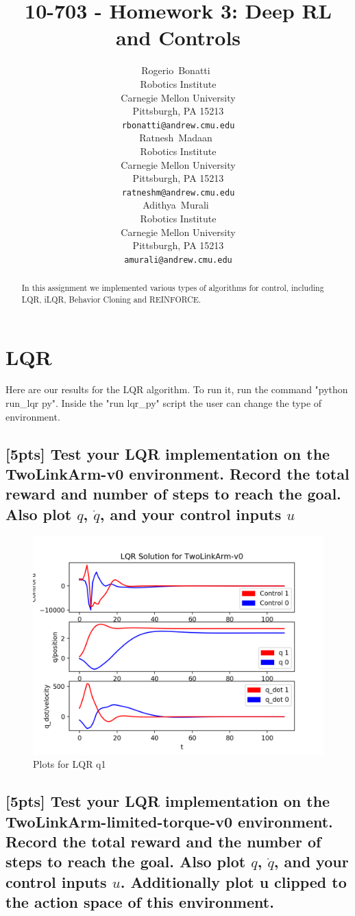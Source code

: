 \documentclass{article}
\title{10-703 - Homework 3: Deep RL and Controls}
\author{
  Rogerio~Bonatti\ \\
  Robotics Institute\\
  Carnegie Mellon University\\
  Pittsburgh, PA 15213 \\
  \texttt{rbonatti@andrew.cmu.edu} \\
  \And
  Ratnesh~Madaan\ \\
  Robotics Institute\\
  Carnegie Mellon University\\
  Pittsburgh, PA 15213 \\
  \texttt{ratneshm@andrew.cmu.edu} \\
  \And
  Adithya~Murali\ \\
  Robotics Institute\\
  Carnegie Mellon University\\
  Pittsburgh, PA 15213 \\
  \texttt{amurali@andrew.cmu.edu} \\
}
\begin{document}

\maketitle

\begin{abstract}
  In this assignment we implemented various types of algorithms for control, including LQR, iLQR, Behavior Cloning and REINFORCE. 
\end{abstract}

\section{LQR}
Here are our results for the LQR algorithm. To run it, run the command "python run\_lqr py". Inside the "run lqr\_py" script the user can change the type of environment.

\subsection{[5pts] Test your LQR implementation on the TwoLinkArm-v0 environment. Record the total reward and number of steps to reach the goal. Also plot $q$, $\dot{q}$, and your control inputs $u$}

\begin{figure}[H] \label{fig:lqr_qn1}
  \centering
  \includegraphics[width=1.2\textwidth]{images/lqr_qn1}
  \caption{Plots for LQR q1}
\end{figure}

\subsection{[5pts] Test your LQR implementation on the TwoLinkArm-limited-torque-v0 environment. Record the total reward and the number of steps to reach the goal. Also plot $q$, $\dot{q}$, and your control inputs $u$. Additionally plot u clipped to the action space of this environment.}
\end{document}
